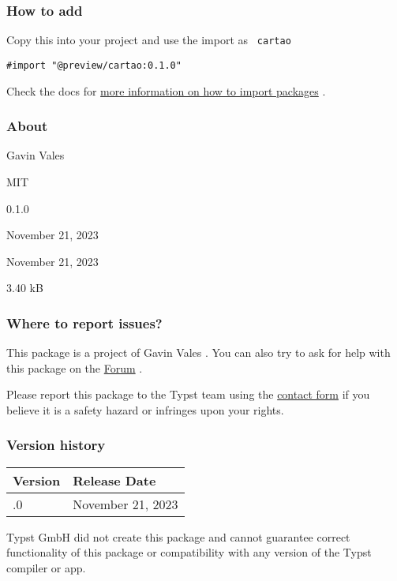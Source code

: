 \subsubsection{How to add}\label{how-to-add}

Copy this into your project and use the import as \texttt{\ cartao\ }

\begin{verbatim}
#import "@preview/cartao:0.1.0"
\end{verbatim}



Check the docs for
\href{https://typst.app/docs/reference/scripting/\#packages}{more
information on how to import packages} .

\subsubsection{About}\label{about}

\begin{description}
\tightlist
\item[Author :]
Gavin Vales
\item[License:]
MIT
\item[Current version:]
0.1.0
\item[Last updated:]
November 21, 2023
\item[First released:]
November 21, 2023
\item[Archive size:]
3.40 kB
\href{https://packages.typst.org/preview/cartao-0.1.0.tar.gz}{\pandocbounded{}}
\end{description}

\subsubsection{Where to report issues?}\label{where-to-report-issues}

This package is a project of Gavin Vales . You can also try to ask for
help with this package on the \href{https://forum.typst.app}{Forum} .

Please report this package to the Typst team using the
\href{https://typst.app/contact}{contact form} if you believe it is a
safety hazard or infringes upon your rights.

\label{versions}
\subsubsection{Version history}\label{version-history}

\begin{longtable}[]{@{}ll@{}}
\toprule\noalign{}
Version & Release Date \\
\midrule\noalign{}
\endhead
\bottomrule\noalign{}
\endlastfoot
0.1.0 & November 21, 2023 \\
\end{longtable}

Typst GmbH did not create this package and cannot guarantee correct
functionality of this package or compatibility with any version of the
Typst compiler or app.

